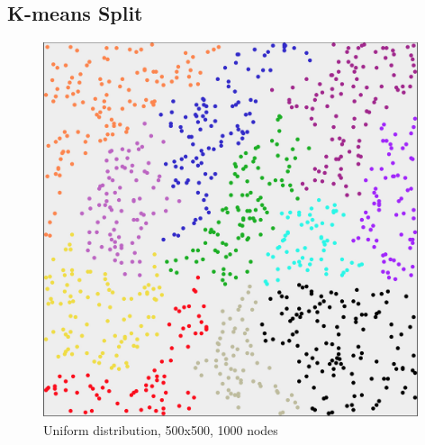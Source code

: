 \begin{appendices}


	\section{K-means Split}
	\label{appendix:kmeanssplit}
	\begin{figure}
		\centering
		\includegraphics[width=11cm]{Images/computations/KMEANS500x500_1000n.jpg}
		\caption{Uniform distribution, 500x500, 1000 nodes}
	\end{figure}


\end{appendices}
